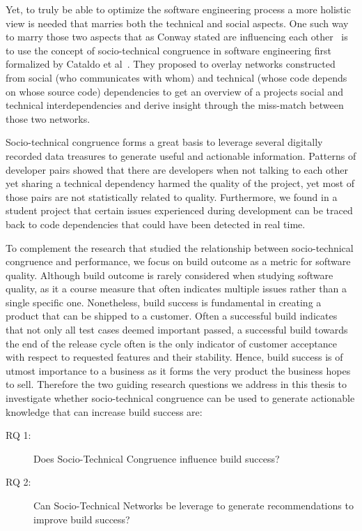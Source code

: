 Yet, to truly be able to optimize the software engineering process a more holistic view is needed that marries both the technical and social aspects.
One such way to marry those two aspects that as Conway stated are influencing each other~\cite{conway:datamination:1968} is to use the concept of socio-technical congruence in software engineering first formalized by Cataldo et al~\cite{cataldo:cscw:2006}.
They proposed to overlay networks constructed from social (who communicates with whom) and technical (whose code depends on whose source code) dependencies to get an overview of a projects social and technical interdependencies and derive insight through the miss-match between those two networks.



Socio-technical congruence forms a great basis to leverage several digitally recorded data treasures to generate useful and actionable information.
Patterns of developer pairs showed that there are developers when not talking to each other yet sharing a technical dependency harmed the quality of the project, yet most of those pairs are not statistically related to quality.
Furthermore, we found in a student project that certain issues experienced during development can be traced back to code dependencies that could have been detected in real time.

To complement the research that studied the relationship between socio-technical congruence and performance, we focus on build outcome as a metric for software quality.
Although build outcome is rarely considered when studying software quality, as it a course measure that often indicates multiple issues rather than a single specific one.
Nonetheless,  build success is fundamental in creating a product that can be shipped to a customer.
Often a successful build indicates that not only all test cases deemed important passed, a successful build towards the end of the release cycle often is the only indicator of customer acceptance with respect to requested features and their stability.
Hence, build success is of utmost importance to a business as it forms the very product the business hopes to sell.
Therefore the two guiding research questions we address in this thesis to investigate whether socio-technical congruence can be used to generate actionable knowledge that can increase build success are:
\begin{description}
\item[RQ 1:] Does Socio-Technical Congruence influence build success?
\item[RQ 2:] Can Socio-Technical Networks be leverage to generate recommendations to improve build success?
\end{description}

